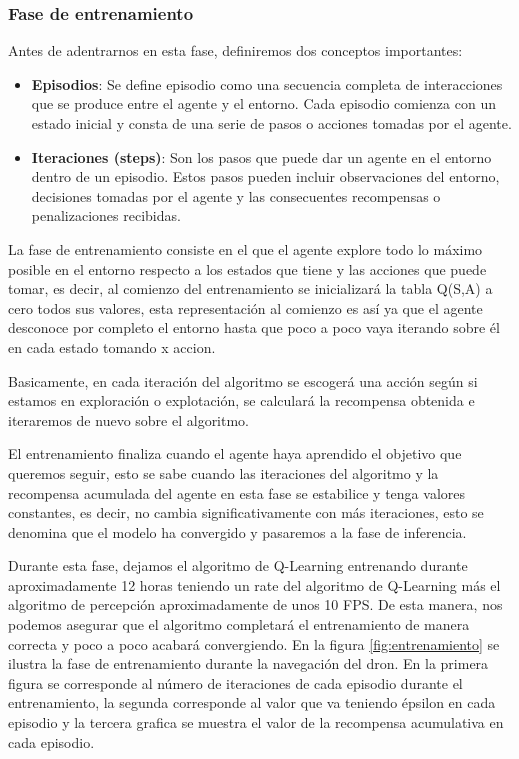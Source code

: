 \subsubsection{Fase de entrenamiento}
\label{sec:fases_ql}
 Antes de adentrarnos en esta fase, definiremos dos conceptos importantes:
 \begin{itemize}
  \item \textbf{Episodios}: Se define episodio como una secuencia completa de interacciones que se produce entre el agente y el entorno. Cada episodio comienza con un estado inicial y consta de una serie 
  de pasos o acciones tomadas por el agente.
  \item \textbf{Iteraciones (steps)}: Son los pasos que puede dar un agente en el entorno dentro de un episodio. Estos pasos pueden incluir observaciones del entorno, decisiones tomadas por el agente
  y las consecuentes recompensas o penalizaciones recibidas.
\end{itemize}

 
 La fase de entrenamiento consiste en el que el agente explore todo lo máximo posible en el entorno respecto a los estados que tiene y las acciones que puede tomar, es decir, al comienzo del entrenamiento se inicializará la tabla Q(S,A) a cero todos sus valores, esta representación
 al comienzo es así ya que el agente desconoce por completo el entorno hasta que poco a poco vaya iterando sobre él en cada estado tomando x accion. \newline
 
 Basicamente, en cada iteración del algoritmo se escogerá una acción según si estamos en exploración o explotación, se calculará la recompensa obtenida e iteraremos de nuevo sobre el algoritmo.

 El entrenamiento finaliza cuando el agente haya aprendido el objetivo que queremos seguir, esto se sabe cuando las iteraciones del algoritmo y la recompensa acumulada del agente en esta 
 fase se estabilice y tenga valores constantes, es decir, no cambia significativamente con más iteraciones, esto se denomina que el modelo ha convergido y pasaremos a la fase de inferencia. \newline

Durante esta fase, dejamos el algoritmo de Q-Learning entrenando durante aproximadamente 12 horas teniendo un rate del algoritmo de Q-Learning más el algoritmo de percepción aproximadamente de 
unos 10 FPS. De esta manera, nos podemos asegurar que el algoritmo completará el entrenamiento de manera correcta y poco a poco 
acabará convergiendo. 
En la figura \ref{fig:entrenamiento} se ilustra la fase de entrenamiento durante la navegación del dron. En la primera figura se corresponde al número de iteraciones de cada 
episodio durante el entrenamiento, la segunda corresponde al valor que va teniendo épsilon en cada episodio y la tercera grafica se muestra el valor de la recompensa 
acumulativa en cada episodio. \newline


